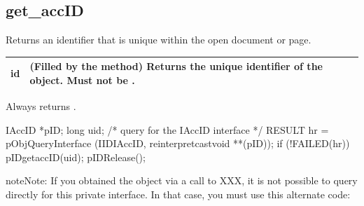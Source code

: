 \documentclass[letterpaper,12pt,english,openany,oneside]{sphinxmanual}
\begin{document}
\subsection{get\_accID}
\label{\detokenize{MSAA_PDF:get-accid}}
Returns an identifier that is unique within the open document or page.

\begin{sphinxVerbatim}[commandchars=\\\{\}]
  
\end{sphinxVerbatim}



\begin{savenotes}\sphinxattablestart
\centering
\begin{tabulary}{\linewidth}[t]{|T|T|}
\hline

id
&
(Filled by the method) Returns the unique identifier of the  object. Must not be  .
\\
\hline
\end{tabulary}
\par
\sphinxattableend\end{savenotes}


Always returns  .


\begin{sphinxVerbatim}[commandchars=\\\{\}]
IAccID *pID;
 long uid;
 /* query for the IAccID interface */
 RESULT hr = pObj\PYGZhy{}\PYGZgt{}QueryInterface (IID\PYGZus{}IAccID,
                                         reinterpret\PYGZus{}cast\PYGZlt{}void **\PYGZgt{}(\PYGZam{}pID));
 if (!FAILED(hr))
 \PYGZob{}
         pID\PYGZhy{}\PYGZgt{}get\PYGZus{}accID(\PYGZam{}uid);
         pID\PYGZhy{}\PYGZgt{}Release();
 \PYGZcb{}
\end{sphinxVerbatim}

\begin{sphinxadmonition}{note}{Note:}
If you obtained the  object via a call to  XXX, it is not possible to query directly for this private interface. In that case, you must use this alternate code:
\end{sphinxadmonition}
\end{document}

